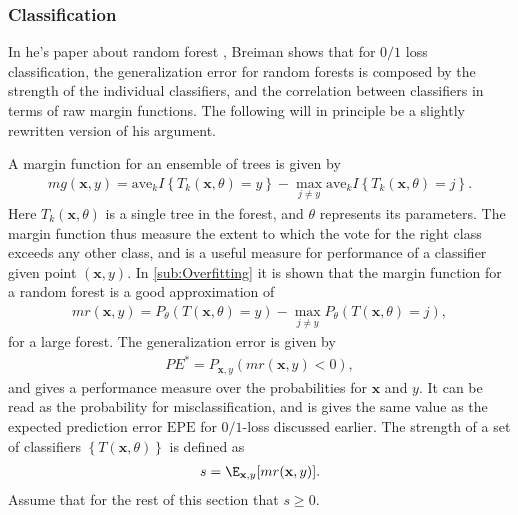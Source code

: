 \subsubsection{Classification}
\label{sub:Classification}
In he's paper about random forest \cite{randomforests}, Breiman shows that for $0/1$ loss classification, the generalization error for random forests is composed by the strength of the individual classifiers, and the correlation between classifiers in terms of raw margin functions. The following will in principle be a slightly rewritten version of his argument.

A margin function for an ensemble of trees is given by
\begin{align}
  mg(\mathbf{x}, y) = \mathrm{ave}_k I\left\{ T_k(\mathbf{x}, \theta) = y \right\} - 
  \max_{j \neq y} \mathrm{ave}_k I\left\{ T_k(\mathbf{x}, \theta) = j \right\}.
\end{align}
Here $T_k(\mathbf{x}, \theta)$ is a single tree in the forest, and $\theta$ represents its parameters. 
The margin function thus measure the extent to which the vote for the right class exceeds any other class, and is a useful measure for performance of a classifier given point $(\mathbf{x}, y)$.  
In \ref{sub:Overfitting} it is shown that the margin function for a random forest is a good approximation of
\begin{align}
  mr(\mathbf{x}, y) = P_{\theta} (T(\mathbf{x}, \theta) = y) - \max_{j \neq y} P_{\theta}(T(\mathbf{x}, \theta) = j), 
\end{align}
for a large forest. The generalization error is given by
\begin{align}
  PE^* = P_{\mathbf{x}, y}(mr(\mathbf{x}, y) < 0),
\end{align}
and gives a performance measure over the probabilities for $\mathbf{x}$ and $y$. It can be read as the probability for misclassification, and is gives the same value as the expected prediction error $\mathrm{EPE}$ for $0/1$-loss discussed earlier. 
The strength of a set of classifiers $\left\{ T(\mathbf{x}, \theta) \right\}$ is defined as
\begin{align}
  s = \E_{\mathbf{x}, y} [mr(\mathbf{x}, y)]. 
\end{align}
Assume that for the rest of this section that $s \geq 0$. 

